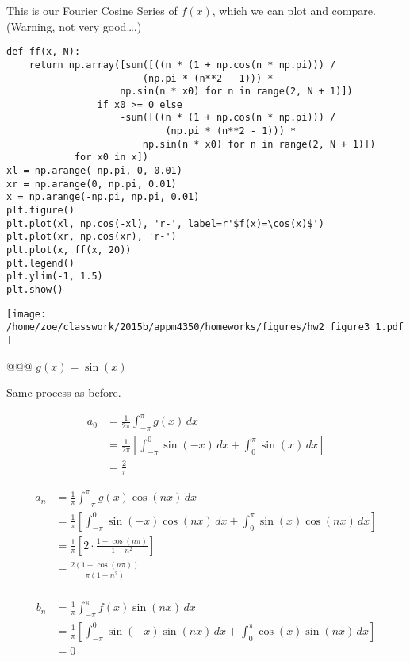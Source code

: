 \documentclass[10pt]{article}
\begin{document}
\begin{easylist}[enumerate]
    This is our Fourier Cosine Series of $f(x)$, which we can plot and compare. (Warning, not very good\ldots.)

\weave

\begin{verbatim}
def ff(x, N):
    return np.array([sum([((n * (1 + np.cos(n * np.pi))) /
                        (np.pi * (n**2 - 1))) *
                    np.sin(n * x0) for n in range(2, N + 1)])
                if x0 >= 0 else
                    -sum([((n * (1 + np.cos(n * np.pi))) /
                            (np.pi * (n**2 - 1))) *
                        np.sin(n * x0) for n in range(2, N + 1)])
            for x0 in x])
xl = np.arange(-np.pi, 0, 0.01)
xr = np.arange(0, np.pi, 0.01)
x = np.arange(-np.pi, np.pi, 0.01)
plt.figure()
plt.plot(xl, np.cos(-xl), 'r-', label=r'$f(x)=\cos(x)$')
plt.plot(xr, np.cos(xr), 'r-')
plt.plot(x, ff(x, 20))
plt.legend()
plt.ylim(-1, 1.5)
plt.show()
\end{verbatim}
\texttt{[image: /home/zoe/classwork/2015b/appm4350/homeworks/figures/hw2\_figure3\_1.pdf]}

\noweave

    @@@ $g(x) = \sin(x)$

    Same process as before.

    \begin{align*}
        a_0 &= \frac{1}{2\pi} \int_{-\pi}^\pi g(x) \, dx\\
            &= \frac{1}{2\pi} \left[ \int_{-\pi}^0 \sin(-x) \, dx + \int_{0}^\pi \sin(x) \, dx \right]\\
            &= \frac{2}{\pi}
    \end{align*}

    \begin{align*}
        a_n &= \frac{1}{\pi} \int_{-\pi}^\pi g(x) \cos(nx) \, dx\\
            &= \frac{1}{\pi} \left[ \int_{-\pi}^0 \sin(-x) \cos(nx) \, dx + \int_{0}^\pi \sin(x) \cos(nx) \, dx \right]\\
            &= \frac{1}{\pi} \left[ 2 \cdot \frac{1 + \cos(n\pi)}{1-n^2} \right]\\
            &= \frac{2(1 + \cos(n\pi))}{\pi(1-n^2)}\\
    \end{align*}

    \begin{align*}
        b_n &= \frac{1}{\pi} \int_{-\pi}^\pi f(x) \sin(nx) \, dx\\
            &= \frac{1}{\pi} \left[ \int_{-\pi}^0 \sin(-x) \sin(nx) \, dx + \int_{0}^\pi \cos(x) \sin(nx) \, dx \right]\\
            &= 0
    \end{align*}


\end{easylist}
\end{document}
